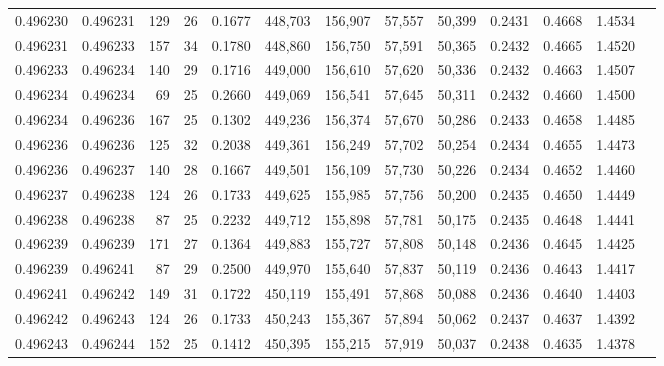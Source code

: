 \begin{tabular}{rrrrrrrrrrrrr}
0.496230 & 0.496231 & 129 &  26 &                                     0.1677 & 448,703 & 156,907 &  57,557 &  50,399 & 0.2431 & 0.4668 & 1.4534 \\
0.496231 & 0.496233 & 157 &  34 &                                     0.1780 & 448,860 & 156,750 &  57,591 &  50,365 & 0.2432 & 0.4665 & 1.4520 \\
0.496233 & 0.496234 & 140 &  29 &                                     0.1716 & 449,000 & 156,610 &  57,620 &  50,336 & 0.2432 & 0.4663 & 1.4507 \\
0.496234 & 0.496234 &  69 &  25 &                                     0.2660 & 449,069 & 156,541 &  57,645 &  50,311 & 0.2432 & 0.4660 & 1.4500 \\
0.496234 & 0.496236 & 167 &  25 &                                     0.1302 & 449,236 & 156,374 &  57,670 &  50,286 & 0.2433 & 0.4658 & 1.4485 \\
0.496236 & 0.496236 & 125 &  32 &                                     0.2038 & 449,361 & 156,249 &  57,702 &  50,254 & 0.2434 & 0.4655 & 1.4473 \\
0.496236 & 0.496237 & 140 &  28 &                                     0.1667 & 449,501 & 156,109 &  57,730 &  50,226 & 0.2434 & 0.4652 & 1.4460 \\
0.496237 & 0.496238 & 124 &  26 &                                     0.1733 & 449,625 & 155,985 &  57,756 &  50,200 & 0.2435 & 0.4650 & 1.4449 \\
0.496238 & 0.496238 &  87 &  25 &                                     0.2232 & 449,712 & 155,898 &  57,781 &  50,175 & 0.2435 & 0.4648 & 1.4441 \\
0.496239 & 0.496239 & 171 &  27 &                                     0.1364 & 449,883 & 155,727 &  57,808 &  50,148 & 0.2436 & 0.4645 & 1.4425 \\
0.496239 & 0.496241 &  87 &  29 &                                     0.2500 & 449,970 & 155,640 &  57,837 &  50,119 & 0.2436 & 0.4643 & 1.4417 \\
0.496241 & 0.496242 & 149 &  31 &                                     0.1722 & 450,119 & 155,491 &  57,868 &  50,088 & 0.2436 & 0.4640 & 1.4403 \\
0.496242 & 0.496243 & 124 &  26 &                                     0.1733 & 450,243 & 155,367 &  57,894 &  50,062 & 0.2437 & 0.4637 & 1.4392 \\
0.496243 & 0.496244 & 152 &  25 &                                     0.1412 & 450,395 & 155,215 &  57,919 &  50,037 & 0.2438 & 0.4635 & 1.4378 \\

\end{tabular}
